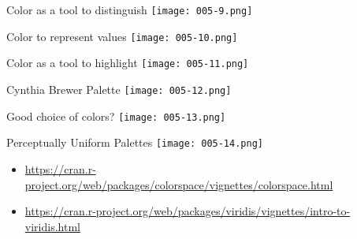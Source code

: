 \documentclass[10pt]{beamer}\usepackage[]{graphicx}\usepackage[]{color}
\begin{document}
	\begin{frame}{Color as a tool to distinguish}
	\centering
	\texttt{[image: 005-9.png]}
\end{frame}


	\begin{frame}{Color to represent values}
	\centering
	\texttt{[image: 005-10.png]}
\end{frame}


	\begin{frame}{Color as a tool to highlight}
	\centering
	\texttt{[image: 005-11.png]}
\end{frame}



	\begin{frame}{Cynthia Brewer Palette}
	\centering
	\texttt{[image: 005-12.png]}
\end{frame}


	\begin{frame}{Good choice of colors?}
	\centering
	\texttt{[image: 005-13.png]}
\end{frame}




	\begin{frame}{Perceptually Uniform Palettes}
	\centering
	\texttt{[image: 005-14.png]}
	
	\begin{itemize}
		\item \url{https://cran.r-project.org/web/packages/colorspace/vignettes/colorspace.html}
		\item \url{https://cran.r-project.org/web/packages/viridis/vignettes/intro-to-viridis.html}
	\end{itemize}
\end{frame}
\end{document}
